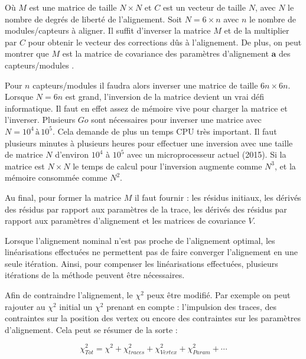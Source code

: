    
  O\`u $M$ est une matrice de taille $N \times N$ et $C$ est un vecteur de taille $N$, avec $N$ le nombre de degr\'es de libert\'e de l'alignement. Soit $N = 6 \times n$ avec $n$ le nombre de modules/capteurs \`a aligner. Il suffit d'inverser la matrice $M$ et de la multiplier par $C$ pour obtenir le vecteur des corrections d\^us \`a l'alignement. De plus, on peut montrer que $M$ est la matrice de covariance des param\`etres d'alignement $\mathbf{a}$ des capteurs/modules \cite{Bocci:2007zzb}.
  
  \medskip
  
  Pour $n$ capteurs/modules il faudra alors inverser une matrice de taille $6n \times 6n$. Lorsque $N=6n$ est grand, l'inversion de la matrice devient un vrai d\'efi informatique. Il faut en effet assez de m\'emoire vive pour charger la matrice et l'inverser. Plusieurs $Go$ sont n\'ecessaires pour inverser une matrice avec $N = 10^4 \, \text{\`a} \, 10^5$. Cela demande de plus un temps CPU tr\`es important. Il faut plusieurs minutes \`a plusieurs heures pour effectuer une inversion avec une taille de matrice $N$ d'environ $10^4$ \`a $10^5$ avec un microprocesseur actuel (2015). Si la matrice est $N \times N$ le temps de calcul pour l'inversion augmente comme $N^3$, et la m\'emoire consomm\'ee comme $N^2$.
  
  \medskip
  
   Au final, pour former la matrice $M$ il faut fournir : les r\'esidus initiaux, les d\'eriv\'es des r\'esidus par rapport aux param\`etres de la trace, les d\'eriv\'es des r\'esidus par rapport aux param\`etres d'alignement et les matrices de covariance $V$. 
  
  \medskip
    
  Lorsque l'alignement nominal n'est pas proche de l'alignement optimal, les lin\'earisations effectu\'ees ne permettent pas de faire converger l'alignement en une seule it\'eration. Ainsi, pour compenser les lin\'earisations effectu\'ees, plusieurs it\'erations de la m\'ethode peuvent \^etre n\'ecessaires.
  
  \medskip 
  
  Afin de contraindre l'alignement, le $\chi^2$ peux \^etre modifi\'e. Par exemple on peut rajouter au $\chi^2$ initial un $\chi^2$ prenant en compte : l'impulsion des traces, des contraintes sur la position des vertex ou encore des contraintes sur les param\`etres d'alignement. Cela peut se r\'esumer de la sorte : 
  
  \begin{equation}
   \chi^2_{Tot} = \chi^2 + \chi^2_{traces} + \chi^2_{Vertex} + \chi^2_{Param} + \cdots
   \label{eq:contraintesChi2}
  \end{equation}

